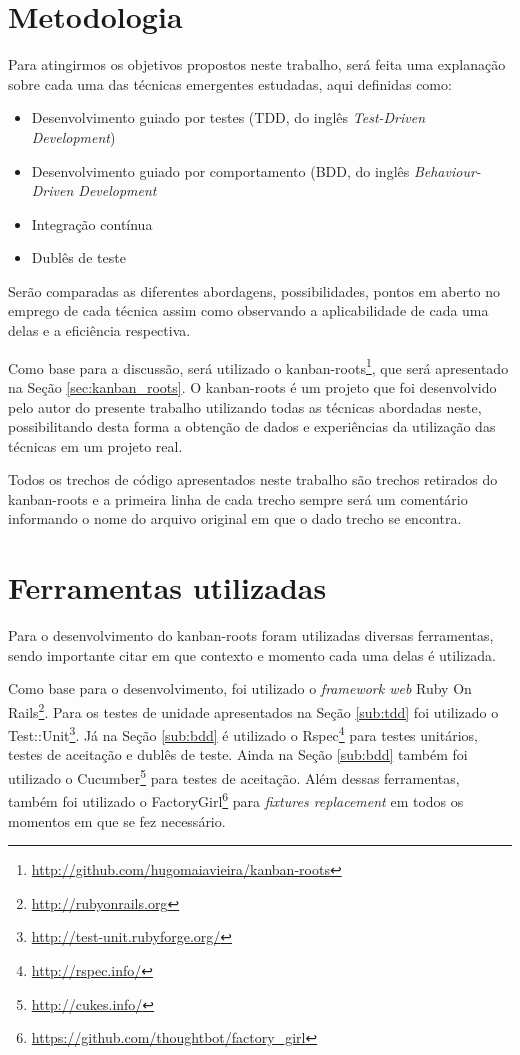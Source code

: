 \section{Metodologia}

Para atingirmos os objetivos propostos neste trabalho, será feita uma explanação sobre cada uma das técnicas emergentes estudadas, aqui definidas como:

\begin{itemize}
  \item Desenvolvimento guiado por testes (TDD, do inglês \textit{Test-Driven Development})
  \item Desenvolvimento guiado por comportamento (BDD, do inglês \textit{Behaviour-Driven Development}
  \item Integração contínua
  \item Dublês de teste
\end{itemize}

Serão comparadas as diferentes abordagens, possibilidades, pontos em aberto no emprego de cada técnica assim como observando a aplicabilidade de cada uma delas e a eficiência respectiva.

Como base para a discussão, será utilizado o kanban-roots\footnote{\url{http://github.com/hugomaiavieira/kanban-roots}}, que será apresentado na Seção \ref{sec:kanban_roots}. O kanban-roots é um projeto que foi desenvolvido pelo autor do presente trabalho utilizando todas as técnicas abordadas neste, possibilitando desta forma a obtenção de dados e experiências da utilização das técnicas em um projeto real.

Todos os trechos de código apresentados neste trabalho são trechos retirados do kanban-roots e a primeira linha de cada trecho sempre será um comentário informando o nome do arquivo original em que o dado trecho se encontra.

\section{Ferramentas utilizadas}

Para o desenvolvimento do kanban-roots foram utilizadas diversas ferramentas, sendo importante citar em que contexto e momento cada uma delas é utilizada.

Como base para o desenvolvimento, foi utilizado o \textit{framework web} Ruby On Rails\footnote{\url{http://rubyonrails.org}}. Para os testes de unidade apresentados na Seção \ref{sub:tdd} foi utilizado o Test::Unit\footnote{\url{http://test-unit.rubyforge.org/}}. Já na Seção \ref{sub:bdd} é utilizado o Rspec\footnote{\url{http://rspec.info/}} para testes unitários, testes de aceitação e dublês de teste. Ainda na Seção \ref{sub:bdd} também foi utilizado o Cucumber\footnote{\url{http://cukes.info/}} para testes de aceitação. Além dessas ferramentas, também foi utilizado o FactoryGirl\footnote{\url{https://github.com/thoughtbot/factory_girl}} para \textit{fixtures replacement} em todos os momentos em que se fez necessário.

